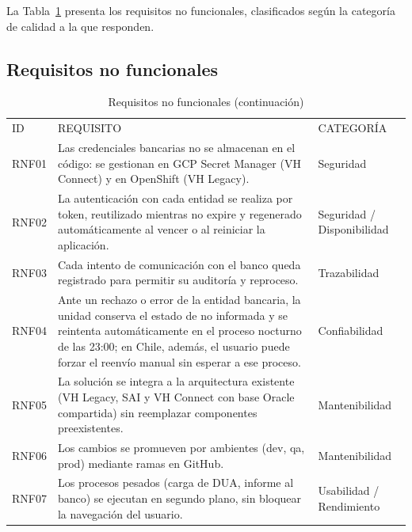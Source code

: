 La Tabla~\ref{tab:14} presenta los requisitos no funcionales, clasificados según la categoría de calidad a la que responden.

\subsection{Requisitos no funcionales}

\begin{longtable}[]{@{}
  >{\raggedright\arraybackslash}p{}
  >{\raggedright\arraybackslash}p{}
  >{\raggedright\arraybackslash}p{}@{}}
\caption{Requisitos no funcionales}\label{tab:14}\\
\toprule\noalign{}
\endfirsthead
\caption[]{Requisitos no funcionales (continuación)}\\
\toprule\noalign{}
\endhead
\bottomrule\noalign{}
\endlastfoot
ID & REQUISITO & CATEGORÍA \\
RNF01 & Las credenciales bancarias no se almacenan en el código: se gestionan en GCP Secret Manager (VH Connect) y en OpenShift (VH Legacy). & Seguridad \\
RNF02 & La autenticación con cada entidad se realiza por token, reutilizado mientras no expire y regenerado automáticamente al vencer o al reiniciar la aplicación. & Seguridad / Disponibilidad \\
RNF03 & Cada intento de comunicación con el banco queda registrado para permitir su auditoría y reproceso. & Trazabilidad \\
RNF04 & Ante un rechazo o error de la entidad bancaria, la unidad conserva el estado de no informada y se reintenta automáticamente en el proceso nocturno de las 23:00; en Chile, además, el usuario puede forzar el reenvío manual sin esperar a ese proceso. & Confiabilidad \\
RNF05 & La solución se integra a la arquitectura existente (VH Legacy, SAI y VH Connect con base Oracle compartida) sin reemplazar componentes preexistentes. & Mantenibilidad \\
RNF06 & Los cambios se promueven por ambientes (dev, qa, prod) mediante ramas en GitHub. & Mantenibilidad \\
RNF07 & Los procesos pesados (carga de DUA, informe al banco) se ejecutan en segundo plano, sin bloquear la navegación del usuario. & Usabilidad / Rendimiento \\
\end{longtable}

